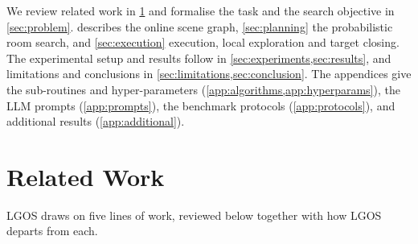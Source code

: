 \documentclass[10pt]{article}
\newcommand{\ours}{LGOS\xspace}
\begin{document}
We review related work in \cref{sec:related} and formalise the task and the search objective in
\cref{sec:problem}.  describes the online scene graph, \cref{sec:planning} the probabilistic
room search, and \cref{sec:execution} execution, local exploration and target closing. The experimental setup and
results follow in \cref{sec:experiments,sec:results}, and limitations and conclusions in
\cref{sec:limitations,sec:conclusion}. The appendices give the sub-routines and hyper-parameters
(\cref{app:algorithms,app:hyperparams}), the LLM prompts (\cref{app:prompts}), the benchmark protocols
(\cref{app:protocols}), and additional results (\cref{app:additional}).

\section{Related Work}
\label{sec:related}

\ours draws on five lines of work, reviewed below together with how \ours departs from each.
\end{document}
